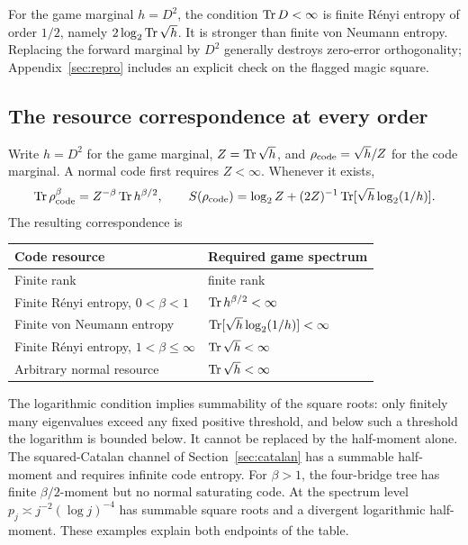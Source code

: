 \begin{remark}
For the game marginal $h=D^2$, the condition $\operatorname{Tr} D<\infty$ is finite R\'enyi entropy of order $1/2$, namely $2\log_2\operatorname{Tr}\sqrt h$. It is stronger than finite von Neumann entropy. Replacing the forward marginal by $D^2$ generally destroys zero-error orthogonality; Appendix~\ref{sec:repro} includes an explicit check on the flagged magic square.
\end{remark}

\subsection{The resource correspondence at every order}\label{sec:codeorders}
Write $h=D^2$ for the game marginal, $Z=\operatorname{Tr}\sqrt h$, and
$\rho_{\rm code}=\sqrt h/Z$ for the code marginal. A normal code first requires
$Z<\infty$. Whenever it exists,
\[
 \operatorname{Tr}\rho_{\rm code}^\beta=Z^{-\beta}\operatorname{Tr} h^{\beta/2},\qquad
 S(\rho_{\rm code})=\log_2Z+(2Z)^{-1}\operatorname{Tr}[\sqrt h\log_2(1/h)].
\]
The resulting correspondence is
\begin{center}\small
\begin{tabular}{@{}ll@{}}\toprule
Code resource & Required game spectrum\\\midrule
Finite rank & finite rank\\
Finite R\'enyi entropy, $0<\beta<1$ & $\operatorname{Tr} h^{\beta/2}<\infty$\\
Finite von Neumann entropy & $\operatorname{Tr}[\sqrt h\log_2(1/h)]<\infty$\\
Finite R\'enyi entropy, $1<\beta\le\infty$ & $\operatorname{Tr}\sqrt h<\infty$\\
Arbitrary normal resource & $\operatorname{Tr}\sqrt h<\infty$\\\bottomrule
\end{tabular}
\end{center}
The logarithmic condition implies summability of the square roots:
only finitely many eigenvalues exceed any fixed positive threshold,
and below such a threshold the logarithm is bounded below.
It cannot be replaced by the half-moment alone. The squared-Catalan
channel of Section~\ref{sec:catalan} has a summable half-moment and
requires infinite code entropy. For $\beta>1$, the four-bridge tree
has finite $\beta/2$-moment but no normal saturating code. At the
spectrum level $p_j\asymp j^{-2}(\log j)^{-4}$ has summable square
roots and a divergent logarithmic half-moment. These examples explain
both endpoints of the table.
